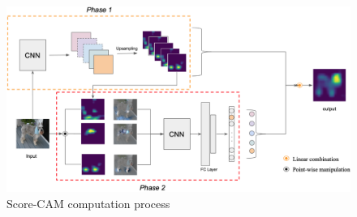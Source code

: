 \begin{figure}[t]
    \centering
    \includegraphics[width=\textwidth]{fig/rel/images/scorecam_schema.png}
    \caption{Score-CAM computation process \autocite{wang2020score}}
    \label{fig:rel_sccam}
\end{figure}